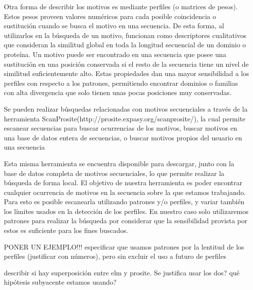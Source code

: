 Otra forma de describir los motivos es mediante perfiles (o matrices de pesos). Estos pesos proveen valores numéricos para cada posible coincidencia o sustitución cuando se busca el motivo en una secuencia. De esta forma, al utilizarlos en la búsqueda de un motivo, funcionan como descriptores cualitativos que consideran la similitud global en toda la longitud secuencial de un dominio o proteína. Un motivo puede ser encontrado en una secuencia que posee una sustitución en una posición conservada si el resto de la secuencia tiene un nivel de similitud suficientemente alto.
Estas propiedades dan una mayor sensibilidad a los perfiles con respecto a los patrones, permitiendo encontrar dominios o familias con alta divergencia que solo tienen unas pocas posiciones muy conservadas.


Se pueden realizar búsquedas relacionadas con motivos secuenciales a través de la herramienta ScanProsite(http://prosite.expasy.org/scanprosite/), la cual permite escanear secuencias para buscar ocurrencias de los motivos, buscar motivos en una base de datos entera de secuencias, o buscar motivos propios del usuario en una secuencia

Esta misma herramienta se encuentra disponible para descargar, junto con la base de datos completa de motivos secuenciales, lo que permite realizar la búsqueda de forma local.
El objetivo de nuestra herramienta es poder encontrar cualquier ocurrencia de motivos en la secuencia sobre la que estamos trabajando. Para esto es posible escanearla utilizando patrones y/o perfiles, y variar también los límites usados en la detección de los perfiles. En nuestro caso solo utilizaremos patrones para realizar la búsqueda por considerar que la sensibilidad provista por estos es suficiente para los fines buscados.

PONER UN EJEMPLO!!! especificar que usamos patrones por la lentitud de los perfiles (justificar con números), pero sin excluir el uso a futuro de perfiles

describir si hay superposición entre elm y prosite. Se justifica usar los dos? qué hipótesis subyacente estamos usando?


% 


